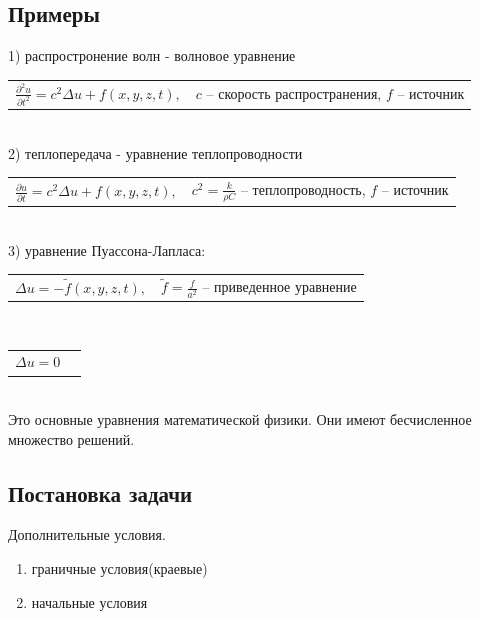 \subsection{Примеры}
1) распростронение волн - волновое уравнение \par\medskip
\begin{tabular}{p{} p{}}
	\hspace{1cm}\(\displaystyle
	\frac{\partial^2 u}{\partial t^2} = c^2 \Delta u + f(x, y, z, t),
	\) &
	\(c\) -- скорость распространения, $f$ -- источник
\end{tabular}  \bigskip\\
2) теплопередача - уравнение теплопроводности \par\medskip
\begin{tabular}{p{} p{}}
	\hspace{1cm}\(\displaystyle
	\frac{\partial u}{\partial t} = c^2 \Delta u + f(x, y, z, t) ,
	\) &
	$c^2 = \frac{k}{\rho C}$ -- теплопроводность, $f$ -- источник
\end{tabular} \bigskip\\
3) уравнение Пуассона-Лапласа:\par\medskip
\begin{tabular}{p{} p{}}
	\hspace{1cm}\(\displaystyle
	\Delta u = -\tilde f(x, y, z, t) ,
	\) &
	$\tilde f=\frac{f}{a^2}$ -- приведенное уравнение
\end{tabular} \\
\begin{tabular}{p{} p{}}
	\hspace{1cm}\(\displaystyle
	\Delta u = 0
	\) &
\end{tabular} \\
Это основные уравнения математической физики. Они имеют бесчисленное множество решений.
\subsection{Постановка задачи}
Дополнительные условия.
\begin{enumerate}[nosep]
	\item граничные условия(краевые)
	\item начальные условия
\end{enumerate}

